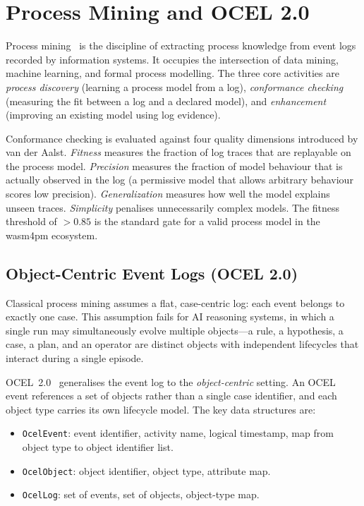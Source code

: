 \section{Process Mining and OCEL 2.0}
\label{sec:process-mining}

Process mining~\cite{vanderaalst2016} is the discipline of extracting
process knowledge from event logs recorded by information systems.  It
occupies the intersection of data mining, machine learning, and formal process
modelling.  The three core activities are \emph{process discovery} (learning a
process model from a log), \emph{conformance checking} (measuring the fit
between a log and a declared model), and \emph{enhancement} (improving an
existing model using log evidence).

Conformance checking is evaluated against four quality dimensions introduced
by van der Aalst.  \emph{Fitness} measures the fraction of log traces that
are replayable on the process model.  \emph{Precision} measures the fraction
of model behaviour that is actually observed in the log (a permissive model
that allows arbitrary behaviour scores low precision).  \emph{Generalization}
measures how well the model explains unseen traces.  \emph{Simplicity} penalises
unnecessarily complex models.  The fitness threshold of $>0.85$ is the
standard gate for a valid process model in the wasm4pm ecosystem.

\subsection{Object-Centric Event Logs (OCEL 2.0)}
\label{subsec:ocel}

Classical process mining assumes a flat, case-centric log: each event belongs
to exactly one case.  This assumption fails for AI reasoning systems, in which
a single run may simultaneously evolve multiple objects---a rule, a
hypothesis, a case, a plan, and an operator are distinct objects with
independent lifecycles that interact during a single episode.

OCEL~2.0~\cite{ghahfarokhi2021} generalises the event log to the
\emph{object-centric} setting.  An OCEL event references a set of objects
rather than a single case identifier, and each object type carries its own
lifecycle model.  The key data structures are:
\begin{itemize}
  \item \texttt{OcelEvent}: event identifier, activity name, logical timestamp,
        map from object type to object identifier list.
  \item \texttt{OcelObject}: object identifier, object type, attribute map.
  \item \texttt{OcelLog}: set of events, set of objects, object-type map.
\end{itemize}

